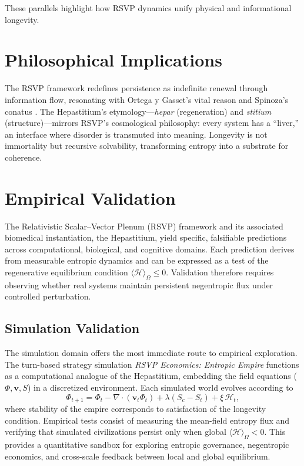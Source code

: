 \documentclass[12pt]{article}
\begin{document}
These parallels highlight how RSVP dynamics unify physical and informational longevity.

\section{Philosophical Implications}
\label{sec:philosophical_implications}

The RSVP framework redefines persistence as indefinite renewal through information flow, resonating with Ortega y Gasset’s vital reason and Spinoza’s conatus \cite{ortega1930, spinoza1677}. The Hepastitium’s etymology—\emph{hepar} (regeneration) and \emph{stitium} (structure)—mirrors RSVP’s cosmological philosophy: every system has a “liver,” an interface where disorder is transmuted into meaning. Longevity is not immortality but recursive solvability, transforming entropy into a substrate for coherence.

\section{Empirical Validation}
\label{sec:empirical_validation}

The Relativistic Scalar--Vector Plenum (RSVP) framework and its associated
biomedical instantiation, the Hepastitium, yield specific, falsifiable
predictions across computational, biological, and cognitive domains.
Each prediction derives from measurable entropic dynamics and can be
expressed as a test of the regenerative equilibrium condition
\(\langle \mathcal{H} \rangle_\Omega \le 0\).
Validation therefore requires observing whether real systems maintain
persistent negentropic flux under controlled perturbation.

\subsection{Simulation Validation}

The simulation domain offers the most immediate route to empirical
exploration.  The turn-based strategy simulation
\emph{RSVP Economics: Entropic Empire} functions as a computational
analogue of the Hepastitium, embedding the field equations
(\(\Phi,\mathbf{v},S\)) in a discretized environment.
Each simulated world evolves according to
\begin{equation}
\Phi_{t+1} = \Phi_t - \nabla\!\cdot(\mathbf{v}_t \Phi_t)
  + \lambda (S_c - S_t) + \xi\,\mathcal{H}_t,
\end{equation}
where stability of the empire corresponds to satisfaction of the
longevity condition.  Empirical tests consist of measuring the
mean-field entropy flux and verifying that simulated civilizations
persist only when global \(\langle \mathcal{H} \rangle_\Omega < 0\).
This provides a quantitative sandbox for exploring entropic governance,
negentropic economics, and cross-scale feedback between local and
global equilibrium.
\end{document}
